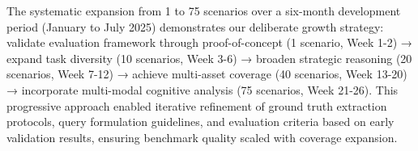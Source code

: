 \documentclass[sigconf, screen, nonacm]{acmart}
\begin{document}
The systematic expansion from 1 to 75 scenarios over a six-month development period (January to July 2025) demonstrates our deliberate growth strategy: validate evaluation framework through proof-of-concept (1 scenario, Week 1-2) → expand task diversity (10 scenarios, Week 3-6) → broaden strategic reasoning (20 scenarios, Week 7-12) → achieve multi-asset coverage (40 scenarios, Week 13-20) → incorporate multi-modal cognitive analysis (75 scenarios, Week 21-26). This progressive approach enabled iterative refinement of ground truth extraction protocols, query formulation guidelines, and evaluation criteria based on early validation results, ensuring benchmark quality scaled with coverage expansion.
\end{document}
